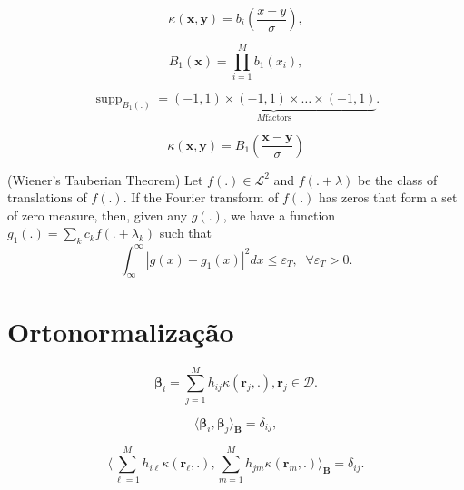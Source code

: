 \begin{equation*}
    \kappa(\mathbf{x},\mathbf{y}) = b_i\left( \frac{x-y}{\sigma}\right),
\end{equation*}

\begin{equation}
    B_1(\mathbf{x}) = \prod_{i=1}^{M}b_1(x_i),
\end{equation}

\begin{equation*}
    \operatorname{supp}_{B_1(.)} = \underbrace{(-1,1)\times(-1,1)\times \dots\times(-1,1)}_{M \text{factors}}.
\end{equation*}

\begin{equation*}
    \kappa(\mathbf{x},\mathbf{y}) = B_1\left( \frac{\mathbf{x} - \mathbf{y}}{\sigma} \right)
\end{equation*}

\begin{theorem}
    (Wiener's Tauberian Theorem) Let $f(.) \in \mathcal{L}^2$ and $f(.+\lambda)$ be the class of translations of $f(.)$. If the Fourier transform of $f(.)$ has zeros that form a set of zero measure, then, given any $g(.)$, we have a function $g_1(.) = \sum_k c_kf(.+\lambda_k)$ such that 
    \begin{equation*}
        \int_{\infty}^{\infty}|g(x) - g_1(x)|^2dx \leq \varepsilon_T,\;\; \forall\varepsilon_T>0.
    \end{equation*}
\end{theorem}

\section{Ortonormalização}

\begin{equation}
    \boldsymbol{\beta}_i = \sum_{j=1}^{M}h_{ij}\kappa(\mathbf{r}_j,.), \mathbf{r}_j \in \mathcal{D}.\label{eq:linearComb}
\end{equation}

\begin{equation}
    \langle \boldsymbol{\beta}_i, \boldsymbol{\beta}_j \rangle_{\mathbf{B}} = \delta_{ij},\label{eq:KronDelta}
\end{equation}

\begin{equation}
    \langle \sum_{\ell=1}^{M}h_{i\ell}\kappa(\mathbf{r}_\ell,.), \sum_{m=1}^{M}h_{jm}\kappa(\mathbf{r}_m,.) \rangle_{\mathbf{B}} = \delta_{ij}.
\end{equation}

